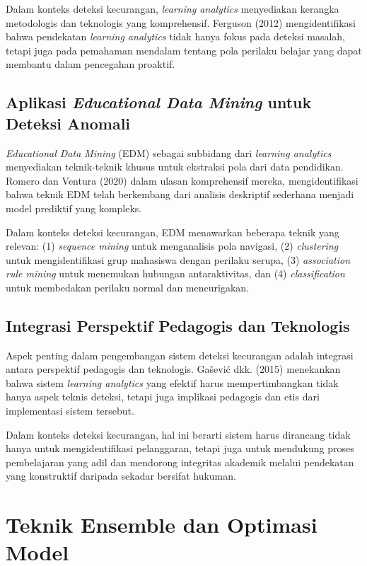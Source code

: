 Dalam konteks deteksi kecurangan, \textit{learning analytics} menyediakan kerangka metodologis dan teknologis yang komprehensif. Ferguson (2012) mengidentifikasi bahwa pendekatan \textit{learning analytics} tidak hanya fokus pada deteksi masalah, tetapi juga pada pemahaman mendalam tentang pola perilaku belajar yang dapat membantu dalam pencegahan proaktif.

\subsection{Aplikasi \textit{Educational Data Mining} untuk Deteksi Anomali}

\textit{Educational Data Mining} (EDM) sebagai subbidang dari \textit{learning analytics} menyediakan teknik-teknik khusus untuk ekstraksi pola dari data pendidikan. Romero dan Ventura (2020) dalam ulasan komprehensif mereka, mengidentifikasi bahwa teknik EDM telah berkembang dari analisis deskriptif sederhana menjadi model prediktif yang kompleks.

Dalam konteks deteksi kecurangan, EDM menawarkan beberapa teknik yang relevan: (1) \textit{sequence mining} untuk menganalisis pola navigasi, (2) \textit{clustering} untuk mengidentifikasi grup mahasiswa dengan perilaku serupa, (3) \textit{association rule mining} untuk menemukan hubungan antaraktivitas, dan (4) \textit{classification} untuk membedakan perilaku normal dan mencurigakan.

\subsection{Integrasi Perspektif Pedagogis dan Teknologis}

Aspek penting dalam pengembangan sistem deteksi kecurangan adalah integrasi antara perspektif pedagogis dan teknologis. Ga\v{s}evi\'{c} dkk. (2015) menekankan bahwa sistem \textit{learning analytics} yang efektif harus mempertimbangkan tidak hanya aspek teknis deteksi, tetapi juga implikasi pedagogis dan etis dari implementasi sistem tersebut.

Dalam konteks deteksi kecurangan, hal ini berarti sistem harus dirancang tidak hanya untuk mengidentifikasi pelanggaran, tetapi juga untuk mendukung proses pembelajaran yang adil dan mendorong integritas akademik melalui pendekatan yang konstruktif daripada sekadar bersifat hukuman.

\section{Teknik Ensemble dan Optimasi Model}
\label{sec:ensembleTechniques}

